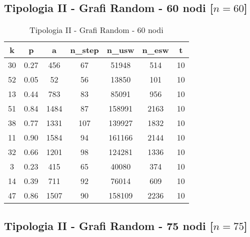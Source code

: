 \subsection{Tipologia II - Grafi Random - 60 nodi [$n=60$]}

\begin{table}[H]
\centering
\begin{tabular}{|c|c|c|c|c|c|c|}
\hline
\textbf{k} & \textbf{p} & \textbf{a} & \textbf{n\_step} & \textbf{n\_usw} & \textbf{n\_esw} & \textbf{t} \\ \hline
30 & 0.27 & 456 & 67 & 51948 & 514 & 10 \\ \hline
52 & 0.05 & 52 & 56 & 13850 & 101 & 10 \\ \hline
13 & 0.44 & 783 & 83 & 85091 & 956 & 10 \\ \hline
51 & 0.84 & 1484 & 87 & 158991 & 2163 & 10 \\ \hline
38 & 0.77 & 1331 & 107 & 139927 & 1832 & 10 \\ \hline
11 & 0.90 & 1584 & 94 & 161166 & 2144 & 10 \\ \hline
32 & 0.66 & 1201 & 98 & 124281 & 1336 & 10 \\ \hline
3 & 0.23 & 415 & 65 & 40080 & 374 & 10 \\ \hline
14 & 0.39 & 711 & 92 & 76014 & 609 & 10 \\ \hline
47 & 0.86 & 1507 & 90 & 158109 & 2236 & 10 \\ \hline
\end{tabular}
\caption{Tipologia II - Grafi Random - 60 nodi}
\label{tab:sperimentazione-tipo1-60nodi}
\end{table}

\subsection{Tipologia II - Grafi Random - 75 nodi [$n=75$]}

